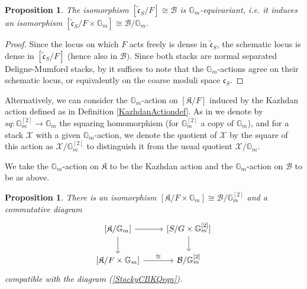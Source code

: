 \documentclass{amsart}
\newtheorem{proposition}[theorem]{Proposition}
\theoremstyle{remark}
\numberwithin{theorem}{section}
\numberwithin{equation}{section}
\begin{document}
\begin{proposition}\label{GmEquivStackyCBKAprp}
    The isomorphism $[\tilde{\mathfrak{c}}_S/F] \cong \mathcal B$ is $\mathbb{G}_m$-equivariant, i.e. it induces an isomorphism $[\tilde{\mathfrak{c}}_S/F \times \mathbb{G}_m] \cong \mathcal B/\mathbb{G}_m$.
\end{proposition}

\begin{proof}
Since the locus on which $F$ acts freely is dense in $\tilde{\mathfrak{c}}_S$, the schematic locus is dense in $[\tilde{\mathfrak{c}}_S/F]$ (hence also in $\mathcal B)$. Since both stacks are normal separated Deligne-Mumford stacks, by \cite[Proposition A.1]{FMN} it suffices to note that the $\mathbb{G}_m$-actions agree on their schematic locus, or equivalently on the coarse moduli space $\mathfrak{c}_S$.
\end{proof}

Alternatively, we can consider the $\mathbb{G}_m$-action on $[\mathfrak{K}/F]$ induced by the Kazhdan action defined as in Definition \ref{KazhdanActiondef}. As in \cite[Proposition 2.5]{Ngo1} we denote by $sq:\mathbb{G}_m^{[2]} \rightarrow \mathbb{G}_m$ the squaring homomorphism (for $\mathbb{G}_m^{[2]}$ a copy of $\mathbb{G}_m$), and for a stack $\mathcal X$ with a given $\mathbb{G}_m$-action, we denote the quotient of $\mathcal X$ by the square of this action as $\mathcal X/\mathbb{G}_m^{[2]}$ to distinguish it from the usual quotient $\mathcal X/\mathbb{G}_m$.

We take the $\mathbb{G}_m$-action on $\mathfrak{K}$ to be the Kazhdan action and the $\mathbb{G}_m$-action on $\mathcal B$ to be as above.
\begin{proposition}\label{StackyHKSectionprp}
   There is an isomorphism $[\mathfrak{K}/F\times \mathbb{G}_m] \cong \mathcal B/\mathbb{G}_m^{[2]}$ and a commutative diagram
   \begin{equation}\label{StackyHKSection1eqn}
        \begin{tikzcd}
            {[\mathfrak{K}/\mathbb{G}_m]} \arrow[r] \arrow[d] & {[S/G \times \mathbb{G}_m^{[2]} ]} \arrow[d] \\
            {[\mathfrak{K}/F \times \mathbb{G}_m]} \arrow[r, "\cong"]  & {\mathcal B/\mathbb{G}_m^{[2]}}         
        \end{tikzcd}
    \end{equation}
    compatible with the diagram (\ref{StackyCBKQeqn}).
\end{proposition}
\end{document}
